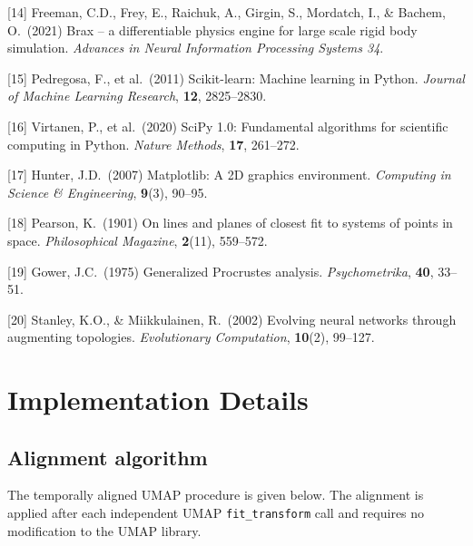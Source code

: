 \documentclass{article}
\begin{document}
{[14] Freeman, C.D., Frey, E., Raichuk, A., Girgin, S., Mordatch, I., \&
Bachem, O.\ (2021)
Brax -- a differentiable physics engine for large scale rigid body simulation.
\textit{Advances in Neural Information Processing Systems 34}.

[15] Pedregosa, F., et al.\ (2011)
Scikit-learn: Machine learning in Python.
\textit{Journal of Machine Learning Research}, \textbf{12}, 2825--2830.

[16] Virtanen, P., et al.\ (2020)
SciPy 1.0: Fundamental algorithms for scientific computing in Python.
\textit{Nature Methods}, \textbf{17}, 261--272.

[17] Hunter, J.D.\ (2007)
Matplotlib: A 2D graphics environment.
\textit{Computing in Science \& Engineering}, \textbf{9}(3), 90--95.

[18] Pearson, K.\ (1901)
On lines and planes of closest fit to systems of points in space.
\textit{Philosophical Magazine}, \textbf{2}(11), 559--572.

[19] Gower, J.C.\ (1975)
Generalized Procrustes analysis.
\textit{Psychometrika}, \textbf{40}, 33--51.

[20] Stanley, K.O., \& Miikkulainen, R.\ (2002)
Evolving neural networks through augmenting topologies.
\textit{Evolutionary Computation}, \textbf{10}(2), 99--127.

}


\appendix

\section{Implementation Details}
\label{app:impl}

\subsection{Alignment algorithm}

The temporally aligned UMAP procedure is given below.
The alignment is applied after each independent UMAP \texttt{fit\_transform}
call and requires no modification to the UMAP library.
\end{document}
